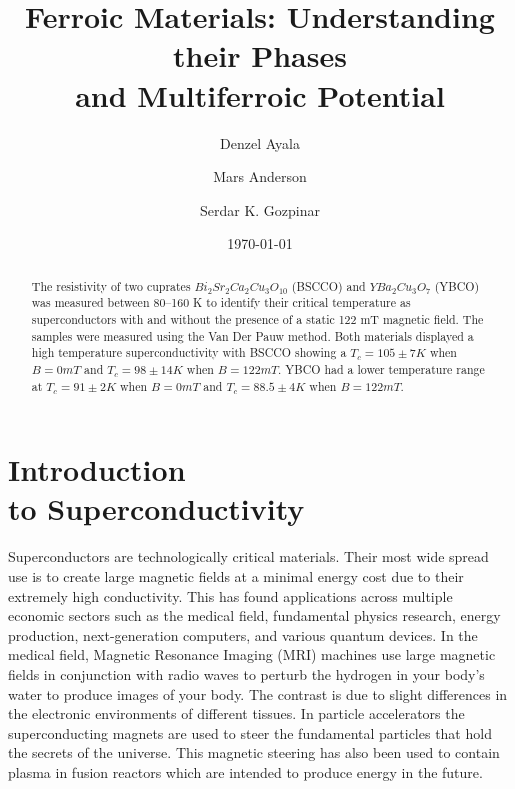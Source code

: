 \documentclass[
reprint,
amsmath,amssymb,
aps,
tikz,
border=5pt
]{revtex4-1}
\begin{document}

\title{Ferroic Materials: Understanding their Phases\\ and Multiferroic Potential}

\author{Denzel Ayala} 
\author{Mars Anderson}
\author{Serdar K. Gozpinar}

%


\date{\today}%

\begin{abstract}

The resistivity of two cuprates $Bi_2Sr_2Ca_{2}Cu_3O_{10}$ (BSCCO) and $YBa_2Cu_3O_7$ (YBCO) was measured between 80--160 K to identify their critical temperature as superconductors with and without the presence of a static 122 mT magnetic field. The samples were measured using the Van Der Pauw method. Both materials displayed a high temperature superconductivity with BSCCO showing a $ T_c = 105\pm 7 K$ when $B=0 mT$ and $T_c = 98\pm 14 K$ when $B=122 mT$. YBCO had a lower temperature range at $T_c = 91\pm 2 K$ when $B=0 mT$ and $T_c = 88.5\pm 4 K$ when $B=122 mT$.

\end{abstract}
\maketitle

\section*{\label{sec:intro}Introduction \\\lowercase{to} Superconductivity}

Superconductors are technologically critical materials. Their most wide spread use is to create large magnetic fields at a minimal energy cost due to their extremely high conductivity. This has found applications across multiple economic sectors such as the medical field, fundamental physics research, energy production, next-generation computers, and various quantum devices.  In the medical field, Magnetic Resonance Imaging (MRI) machines use large magnetic fields in conjunction with radio waves to perturb the hydrogen in your body's water to produce images of your body. The contrast is due to slight differences in the electronic environments of different tissues. In particle accelerators the superconducting magnets are used to steer the fundamental particles that hold the secrets of the universe. This magnetic steering has also been used to contain plasma in fusion reactors which are intended to produce energy in the future.
\end{document}
